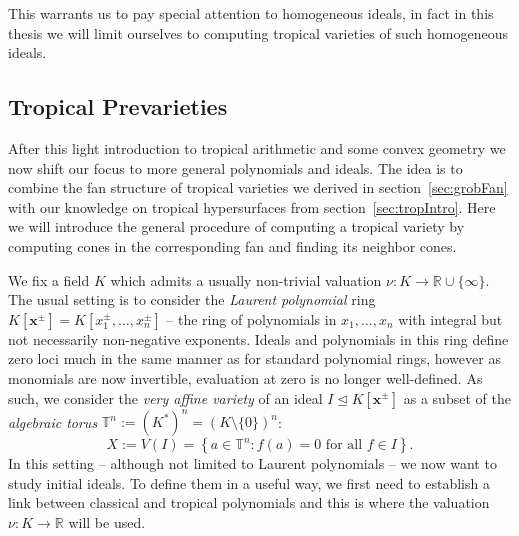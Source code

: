 \documentclass[
  paper=a4,
  DIV=14,
  fontsize=12pt,
  titlepage,
  bibliography=totoc,
  listof=totoc,
  pagesize=pdftex
]{scrartcl}
\numberwithin{figure}{section}
\numberwithin{equation}{section}
\numberwithin{table}{section}
\newcommand*\setR{\mathds{R}}
\newcommand*\setT{\mathds{T}}
\let\vec\mathbf
\let\idealof\trianglelefteq
\theoremstyle{definition}
\numberwithin{definition}{section}
\begin{document}
This warrants us to pay special attention to homogeneous ideals, in fact in this thesis we
will limit ourselves to computing tropical varieties of such homogeneous ideals.


\subsection{Tropical Prevarieties}
\label{sec:tropPre}

After this light introduction to tropical arithmetic and some convex geometry we now shift
our focus to more general polynomials and ideals. The idea is to combine the fan structure
of tropical varieties we derived in section~\ref{sec:grobFan} with our knowledge on
tropical hypersurfaces from section~\ref{sec:tropIntro}. Here we will introduce the
general procedure of computing a tropical variety by computing cones in the corresponding
fan and finding its neighbor cones.

We fix a field $K$ which admits a usually non-trivial valuation $\nu : K \to \setR \cup
\{\infty\}$. The usual setting is to consider the \emph{Laurent polynomial} ring $K[\vec
x^\pm] = K[x_1^\pm, \dots, x_n^\pm]$ -- the ring of polynomials in $x_1, \dots, x_n$ with
integral but not necessarily non-negative exponents. Ideals and polynomials in this ring
define zero loci much in the same manner as for standard polynomial rings, however as
monomials are now invertible, evaluation at zero is no longer well-defined. As such, we
consider the \emph{very affine variety} of an ideal $I \idealof K[\vec x^\pm]$ as a subset
of the \emph{algebraic torus} $\setT^n := {(K^*)}^n = {(K \setminus \{0\})}^n$:
\[
  X := V(I) = \left\{ a \in \setT^n : f(a) = 0 \text{ for all $f \in I$} \right\}.
\]
In this setting -- although not limited to Laurent polynomials -- we now want to study
initial ideals. To define them in a useful way, we first need to establish a link between
classical and tropical polynomials and this is where the valuation $\nu:K\to\setR$ will be
used.
\end{document}
